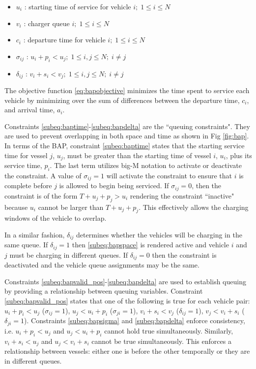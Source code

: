 \documentclass[letterpaper, 10pt, conference]{IEEEtran}
\begin{document}
\begin{itemize}
    \item $u_i$         : starting time of service for vehicle $i;\; 1 \leq i \leq N$
    \item $v_i$         : charger queue $i;\; 1 \leq i \leq N$
    \item $c_i$         : departure time for vehicle $i;\; 1 \leq i \leq N$
    \item $\sigma_{ij}$ : $u_i + p_i < u_j;\; 1 \leq i,j \leq N ;\; i \neq j $
    \item $\delta_{ij}$ : $v_i + s_i < v_j;\; 1 \leq i,j \leq N ;\; i \neq j $
\end{itemize}

The objective function \eqref{eq:bapobjective} minimizes the time spent to service each vehicle by minimizing over the
sum of differences between the departure time, $c_i$, and arrival time, $a_i$.

Constraints \ref{subeq:baptime}-\ref{subeq:bapdelta} are the ``queuing constraints". They are used to prevent
overlapping in both space and time as shown in Fig \ref{fig:bap}. In terms of the BAP, constraint \eqref{subeq:baptime}
states that the starting service time for vessel $j$, $u_j$, must be greater than the starting time of vessel $i$,
$u_i$, plus its service time, $p_i$. The last term utilizes big-M notation to activate or deactivate the constraint. A
value of $\sigma_{ij} = 1$ will activate the constraint to ensure that $i$ is complete before $j$ is allowed to begin being
serviced. If $\sigma_{ij} = 0$, then the constraint is of the form $T + u_j + p_j > u_i$ rendering the constraint ``inactive"
because $u_i$ cannot be larger than $T + u_j + p_j$. This effectively allows the charging windows of the vehicle to
overlap.

In a similar fashion, $\delta_{ij}$ determines whether the vehicles will be charging in the same queue. If $\delta_{ij} = 1$ then
\eqref{subeq:bapspace} is rendered active and vehicle $i$ and $j$ must be charging in different queues. If $\delta_{ij} = 0$
then the constraint is deactivated and the vehicle queue assignments may be the same.

Constraints \ref{subeq:bapvalid_pos}-\ref{subeq:bapdelta} are used to establish queuing by providing a relationship
between queuing variables. Constraint \eqref{subeq:bapvalid_pos} states that one of the following is true for each
vehicle pair: $u_i + p_i < u_j$ ($\sigma_{ij} = 1$), $u_j < u_i + p_i$ ($\sigma_{ji} = 1$), $v_i + s_i < v_j$ ($\delta_{ij} = 1$), $v_j
< v_i + s_i$ ($\delta_{ji} = 1$). Constraints \eqref{subeq:bapsigma} and \eqref{subeq:bapdelta} enforce consistency, i.e.
$u_i + p_i < u_j$ and $u_j < u_i + p_i$ cannot hold true simultaneously. Similarly, $v_i + s_i < u_j$ and $u_j < v_i +
s_i$ cannot be true simultaneously. This enforces a relationship between vessels: either one is before the other
temporally or they are in different queues.
\end{document}
